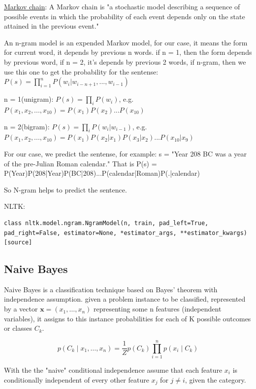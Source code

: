 \documentclass[a4paper]{article}
\begin{document}
\href{https://en.wikipedia.org/wiki/Markov_chain}{Markov chain}: A Markov chain is "a stochastic model describing a sequence of possible events in which the probability of each event depends only on the state attained in the previous event."

An n-gram model is an expended Markov model, for our case, it means the form for current word, it depends by previous n words. if n = 1, then the form depends by previous word, if n = 2, it's depends by previous 2 words, if n-gram, then we use this one to get the probability for the sentense: $P(s)=\prod\limits_{i=1}^{n}P(w_i|w_{i-n+1},...,w_{i-1})$

n = 1(unigram): $P(s)=\prod\limits_{i}P(w_i)$, e.g. $P(x_1,x_2,...,x_{10}) = P(x_1)P(x_2)...P(x_{10})$

n = 2(bigram): $P(s)=\prod\limits_{i}P(w_i|w_{i-1})$, e.g. $P(x_1,x_2,...,x_{10}) = P(x_1)P(x_2|x_1)P(x_3|x_2)...P(x_{10}|x_9)$

For our case, we predict the sentense, for example: 
s = "Year 208 BC was a year of the pre-Julian Roman calendar." 
That is P(s) = P(Year)P(208|Year)P(BC|208)...P(calendar|Roman)P(.|calendar)

So N-gram helps to predict the sentence.

NLTK:
\begin{lstlisting}
class nltk.model.ngram.NgramModel(n, train, pad_left=True, pad_right=False, estimator=None, *estimator_args, **estimator_kwargs)[source]
\end{lstlisting}

\subsection{Naive Bayes}
Naive Bayes is a classification technique based on Bayes' theorem with independence assumption.  given a problem instance to be classified, represented by a vector ${\mathbf  {x}}=(x_{1},\dots ,x_{n})$ representing some n features (independent variables), it assigns to this instance probabilities for each of K possible outcomes or classes $C_{k}$. \cite{murty_pattern_2011}

\[p(C_{k}\mid x_{1},\dots ,x_{n})={\frac {1}{Z}}p(C_{k})\prod _{i=1}^{n}p(x_{i}\mid C_{k})\]

With the the "naive" conditional independence assume that each feature $x_{i}$ is conditionally independent of every other feature $x_{j}$ for $j \neq i$, given the category. 
\end{document}
